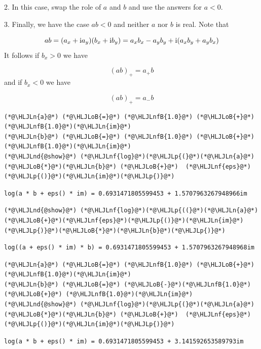 \documentclass[12pt,a4paper]{article}
\newcommand{\HLJLn}[1]{#1}
\newcommand{\HLJLnd}[1]{\textcolor[RGB]{214,102,97}{#1}}
\newcommand{\HLJLnf}[1]{\textcolor[RGB]{66,102,213}{#1}}
\newcommand{\HLJLnfB}[1]{\textcolor[RGB]{59,151,46}{#1}}
\newcommand{\HLJLoB}[1]{\textcolor[RGB]{102,102,102}{\textbf{#1}}}
\newcommand{\HLJLp}[1]{#1}
\def\I{ {\rm i} }
\begin{document}
2. In this case, swap the role of $a$ and $b$ and use the answers for $a < 0$. 

3. Finally, we have the case $a b < 0$ and neither $a$ nor $b$ is real. Note that

\[
ab = (a_x + \I a_y) (b_x + \I b_y) = a_x b_x - a_y b_y +  \I(a_x b_y + a_yb_x)
\]
It follows if $b_x > 0$ we have

\[
(ab)_+ = a_+ b
\]
and if $b_x < 0$ we have

\[
(ab)_+ = a_- b
\]

\begin{lstlisting}
(*@\HLJLn{a}@*) (*@\HLJLoB{=}@*) (*@\HLJLnfB{1.0}@*) (*@\HLJLoB{+}@*) (*@\HLJLnfB{1.0}@*)(*@\HLJLn{im}@*)
(*@\HLJLn{b}@*) (*@\HLJLoB{=}@*) (*@\HLJLnfB{1.0}@*) (*@\HLJLoB{+}@*) (*@\HLJLnfB{1.0}@*)(*@\HLJLn{im}@*)
(*@\HLJLnd{@show}@*) (*@\HLJLnf{log}@*)(*@\HLJLp{(}@*)(*@\HLJLn{a}@*)(*@\HLJLoB{*}@*)(*@\HLJLn{b}@*) (*@\HLJLoB{+}@*)  (*@\HLJLnf{eps}@*)(*@\HLJLp{()}@*)(*@\HLJLn{im}@*)(*@\HLJLp{)}@*)
\end{lstlisting}

\begin{lstlisting}
log(a * b + eps() * im) = 0.6931471805599453 + 1.5707963267948966im
\end{lstlisting}


\begin{lstlisting}
(*@\HLJLnd{@show}@*) (*@\HLJLnf{log}@*)(*@\HLJLp{((}@*)(*@\HLJLn{a}@*)(*@\HLJLoB{+}@*)(*@\HLJLnf{eps}@*)(*@\HLJLp{()}@*)(*@\HLJLn{im}@*)(*@\HLJLp{)}@*)(*@\HLJLoB{*}@*)(*@\HLJLn{b}@*)(*@\HLJLp{)}@*)
\end{lstlisting}

\begin{lstlisting}
log((a + eps() * im) * b) = 0.6931471805599453 + 1.5707963267948968im
\end{lstlisting}


\begin{lstlisting}
(*@\HLJLn{a}@*) (*@\HLJLoB{=}@*) (*@\HLJLnfB{1.0}@*) (*@\HLJLoB{+}@*) (*@\HLJLnfB{1.0}@*)(*@\HLJLn{im}@*)
(*@\HLJLn{b}@*) (*@\HLJLoB{=}@*) (*@\HLJLoB{-}@*)(*@\HLJLnfB{1.0}@*) (*@\HLJLoB{+}@*) (*@\HLJLnfB{1.0}@*)(*@\HLJLn{im}@*)
(*@\HLJLnd{@show}@*) (*@\HLJLnf{log}@*)(*@\HLJLp{(}@*)(*@\HLJLn{a}@*)(*@\HLJLoB{*}@*)(*@\HLJLn{b}@*) (*@\HLJLoB{+}@*)  (*@\HLJLnf{eps}@*)(*@\HLJLp{()}@*)(*@\HLJLn{im}@*)(*@\HLJLp{)}@*)
\end{lstlisting}

\begin{lstlisting}
log(a * b + eps() * im) = 0.6931471805599453 + 3.141592653589793im
\end{lstlisting}
\end{document}
